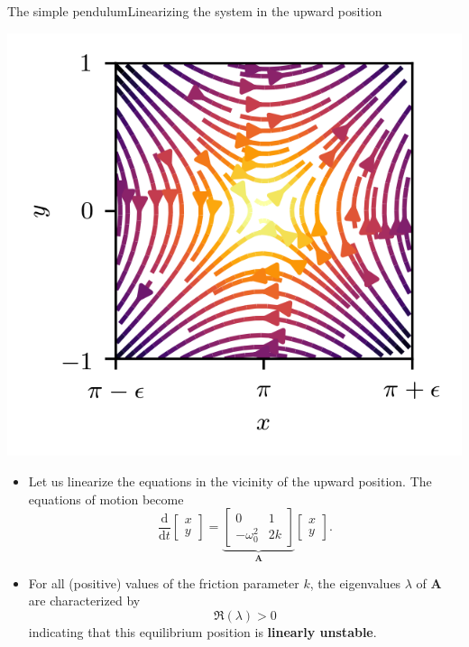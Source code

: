 \documentclass[usenames,dvipsnames,svgnames,10pt,aspectratio=169]{beamer}
\begin{document}
\begin{frame}[t, c]{The simple pendulum}{Linearizing the system in the upward position}
	\begin{minipage}{.28\textwidth}
		\centering
		\includegraphics[width=\textwidth]{pendulum_upward_stab}
	\end{minipage}%
	\hfill
	\begin{minipage}{.68\textwidth}
		\begin{itemize}
			\item Let us linearize the equations in the vicinity of the upward position.
			The equations of motion become
			\[
				\displaystyle \frac{\mathrm{d}}{\mathrm{d}t} \begin{bmatrix} x \\ y \end{bmatrix} = \underbrace{\begin{bmatrix} 0 & 1 \\ -\omega_0^2 & 2k \end{bmatrix}}_{\bm{A}} \begin{bmatrix} x \\ y \end{bmatrix}.
			\]

			\item For all (positive) values of the friction parameter \(k\), the eigenvalues \( \lambda \) of \( \bm{A} \) are characterized by
			\[
				\Re(\lambda) > 0
			\]
			indicating that this equilibrium position is \alert{\textbf{linearly unstable}}.
		\end{itemize}
	\end{minipage}

	\vspace{1cm}
\end{frame}
\end{document}
